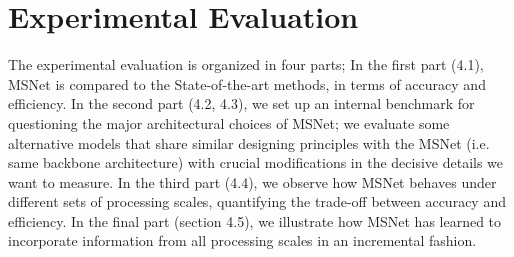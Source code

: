 \documentclass[runningheads]{llncs}
\begin{document}
\begin{table}
    \centering
    \caption{Description of CNN architectures}
    \label{tab:learnable_models}
\end{table}

\section{Experimental Evaluation}

The experimental evaluation is organized in four parts; In the first part (4.1), MSNet is compared to the State-of-the-art methods, in terms of accuracy and efficiency. In the second part (4.2, 4.3), we set up an internal benchmark for questioning the major architectural choices of MSNet; we evaluate some alternative models that share similar designing principles with the MSNet (i.e. same backbone architecture) with crucial modifications in the decisive details we want to measure. In the third part (4.4), we observe how MSNet behaves under different sets of processing scales, quantifying the trade-off between accuracy and efficiency. In the final part (section 4.5), we illustrate how MSNet has learned to incorporate information from all processing scales in an incremental fashion.
\end{document}
